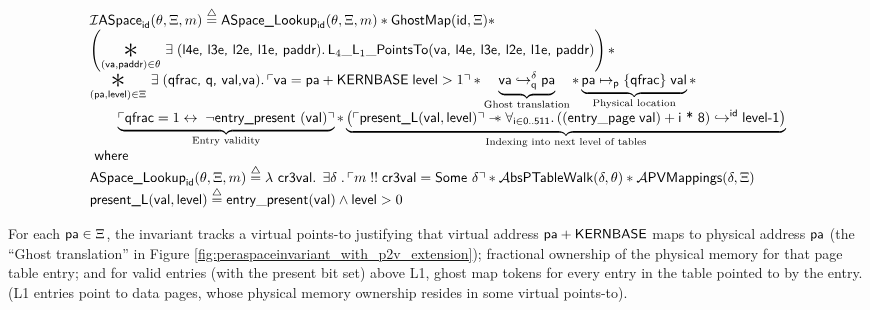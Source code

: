 \begin{figure*}
\footnotesize
\[
\begin{array}{l}
  \mathcal{I}\textsf{ASpace}_{\textsf{id}}(\ptablestore,\Xi,m)\stackrel{\triangle}{=} \textsf{ASpace\_Lookup}_{\textsf{id}}(\ptablestore,\Xi,m) \ast \mathsf{GhostMap}(\mathsf{id},\Xi)\ast\\
  \left(\bigast{(\vaddr, \textsf{paddr})\in \ptablestore}{\exists\;(\textsf{l4e, l3e, l2e, l1e, paddr})\ldotp \textsf{L}_{4}\_\textsf{L}_{1}\_\textsf{PointsTo}(\vaddr\textsf{, l4e, l3e, l2e, l1e, paddr})}\right)\ast \\
  \bigast{(\paddr,\mathsf{level}) \in \Xi}{\exists\; (\textsf{qfrac, q, val,}\vaddr) \ldotp \ulcorner \vaddr = \paddr + \textsf{KERNBASE} \; \textsf{level} > 1\urcorner \ast  \underbrace{\fracghostmaptoken{\delta}{\vaddr}{\paddr}{\qfrac} }_\text{Ghost translation} \ast \underbrace{\paddr \mapsto_{\mathsf{p}}\{\textsf{qfrac}\}\; \vale}_\text{Physical location}} \ast\\
   \qquad\underbrace{ \ulcorner \textsf{qfrac} = 1 \leftrightarrow \; \lnot\textsf{entry\_present }(\vale) \urcorner}_\text{Entry validity}\ast 
    \underbrace{\left(\ulcorner\textsf{present\_L}(\vale,\mathsf{level})\urcorner \wand \forall_{\textsf{i}\in\textsf{0..511}} \ldotp \ghostmaptoken{\textsf{id}}{((\mathsf{entry\_page}\;\vale) + \textsf{i * 8})}{\textsf{level-1}}\right)}_{\text{Indexing into next level of tables}} \\
  \textsf{ where } \\
   \textsf{ASpace\_Lookup}_{\textsf{id}}(\ptablestore,\Xi,m) \stackrel{\triangle}{=} \lambda\textsf{ cr3val} \ldotp \; \exists \gammaPred \; \ldotp \ulcorner m \; !!\; \textsf{cr3val} = \textsf{Some } \gammaPred \urcorner \ast
   \ptableabswalk{\delta,\ptablestore} \ast \pvmapping{\delta,\Xi}\\
  \textsf{present\_L}(\vale,\mathsf{level})\stackrel{\triangle}{=} \mathsf{entry\_present}(\vale)\land \mathsf{level} > 0
  
\end{array}
\]
\vspace{-1em}
\caption{Global Address-Space Invariant in Figure \ref{fig:peraspaceinvariant} extended with a ghost map bookkeeping identity mappings }
  \label{fig:peraspaceinvariant_with_p2v_extension}
\end{figure*}

For each $\textsf{pa}\in\Xi$, the invariant tracks a virtual points-to justifying that virtual address $\textsf{pa}+\textsf{KERNBASE}$ maps to physical address $\textsf{pa}$
(the ``Ghost translation'' in Figure \ref{fig:peraspaceinvariant_with_p2v_extension});
fractional ownership of the physical memory for that page table entry;
and for valid entries (with the present bit set) above L1, ghost map tokens for every entry in the table pointed to by the entry.
(L1 entries point to data pages, whose physical memory ownership resides in some virtual points-to).

